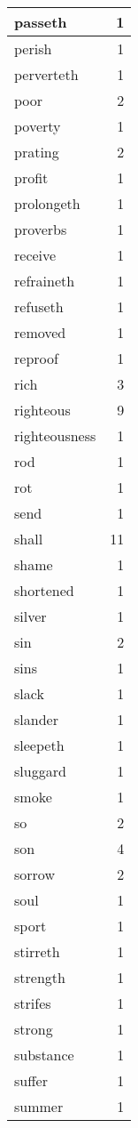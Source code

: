 \begin{center}
\begin{longtable}{l|r}
passeth & 1\\ \hline 
perish & 1\\ \hline 
perverteth & 1\\ \hline 
poor & 2\\ \hline 
poverty & 1\\ \hline 
prating & 2\\ \hline 
profit & 1\\ \hline 
prolongeth & 1\\ \hline 
proverbs & 1\\ \hline 
receive & 1\\ \hline 
refraineth & 1\\ \hline 
refuseth & 1\\ \hline 
removed & 1\\ \hline 
reproof & 1\\ \hline 
rich & 3\\ \hline 
righteous & 9\\ \hline 
righteousness & 1\\ \hline 
rod & 1\\ \hline 
rot & 1\\ \hline 
send & 1\\ \hline 
shall & 11\\ \hline 
shame & 1\\ \hline 
shortened & 1\\ \hline 
silver & 1\\ \hline 
sin & 2\\ \hline 
sins & 1\\ \hline 
slack & 1\\ \hline 
slander & 1\\ \hline 
sleepeth & 1\\ \hline 
sluggard & 1\\ \hline 
smoke & 1\\ \hline 
so & 2\\ \hline 
son & 4\\ \hline 
sorrow & 2\\ \hline 
soul & 1\\ \hline 
sport & 1\\ \hline 
stirreth & 1\\ \hline 
strength & 1\\ \hline 
strifes & 1\\ \hline 
strong & 1\\ \hline 
substance & 1\\ \hline 
suffer & 1\\ \hline 
summer & 1\\ \hline 

\end{longtable}
\end{center}
